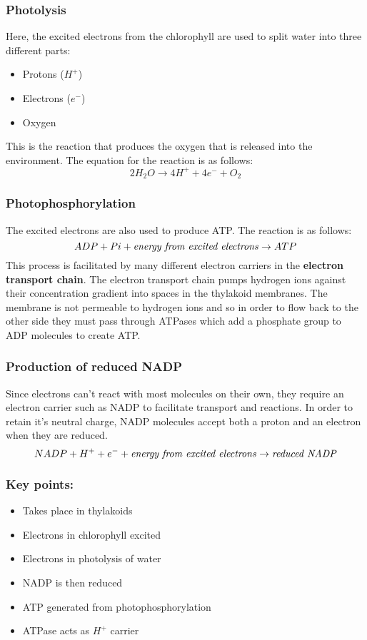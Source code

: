 \documentclass{article}
\begin{document}
\newpage

\subsubsection*{Photolysis}
Here, the excited electrons from the chlorophyll are used to split water into three different parts:
\begin{itemize}
	\item Protons ($H^{+}$)
	\item Electrons ($e^{-}$)
	\item Oxygen
\end{itemize}
This is the reaction that produces the oxygen that is released into the environment. The equation for the reaction is as follows:
\[
	2H_2O \rightarrow 4H^+ + 4e^- + O_2
\]

\subsubsection*{Photophosphorylation}
The excited electrons are also used to produce ATP. The reaction is as follows:
\[
	ADP + Pi + \textrm{\textit{energy from excited electrons}} \rightarrow ATP
\]
This process is facilitated by many different electron carriers in the \textbf{electron transport chain}. The electron transport chain pumps hydrogen ions against their concentration gradient into spaces in the thylakoid membranes. The membrane is not permeable to hydrogen ions and so in order to flow back to the other side they must pass through ATPases which add a phosphate group to ADP molecules to create ATP.

\subsubsection*{Production of reduced NADP}
Since electrons can't react with most molecules on their own, they require an electron carrier such as NADP to facilitate transport and reactions. In order to retain it's neutral charge, NADP molecules accept both a proton and an electron when they are reduced.
\[
	NADP + H^+ + e^- +\textrm{\textit{energy from excited electrons}}\rightarrow \textrm{\textit{reduced NADP}}
\]

\subsubsection*{Key points:}
\begin{multicols}{2}
\begin{itemize}
    \item Takes place in thylakoids
    \item Electrons in chlorophyll excited
    \item Electrons in photolysis of water
    \item NADP is then reduced
    \item ATP generated from photophosphorylation
		\item ATPase acts as $H^+$ carrier
\end{itemize}
\end{multicols}
\end{document}
